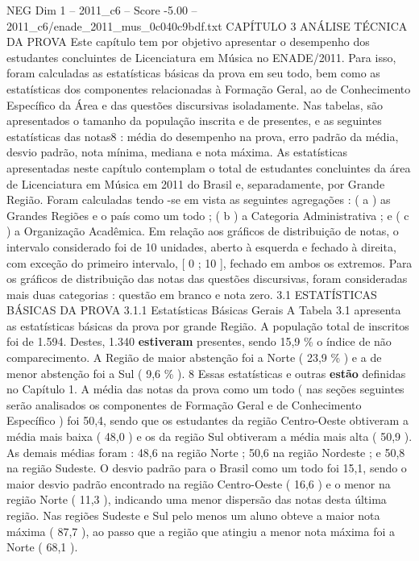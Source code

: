 \begin{textsample}{NEG Dim 1 – 2011\_c6 – Score -5.00 – 2011\_c6/enade\_2011\_mus\_0c040c9bdf.txt}  \label{ex:f1_neg_223}
CAPÍTULO 3 ANÁLISE TÉCNICA DA PROVA Este capítulo tem por objetivo apresentar o desempenho dos estudantes concluintes de Licenciatura em Música no ENADE/2011.
Para isso, foram calculadas as estatísticas básicas da prova em seu todo, bem como as estatísticas dos componentes relacionadas à Formação Geral, ao de Conhecimento Específico da Área e das questões discursivas isoladamente.
Nas tabelas, são apresentados o tamanho da população inscrita e de presentes, e as seguintes estatísticas das notas8 : média do desempenho na prova, erro padrão da média, desvio padrão, nota mínima, mediana e nota máxima.
As estatísticas apresentadas neste capítulo contemplam o total de estudantes concluintes da área de Licenciatura em Música em 2011 do Brasil e, separadamente, por Grande Região.
Foram calculadas tendo -se em vista as seguintes agregações : ( a ) as Grandes Regiões e o país como um todo ; ( b ) a Categoria Administrativa ; e ( c ) a Organização Acadêmica.
Em relação aos gráficos de distribuição de notas, o intervalo considerado foi de 10 unidades, aberto à esquerda e fechado à direita, com exceção do primeiro intervalo, [ 0 ; 10 ], fechado em ambos os extremos.
Para os gráficos de distribuição das notas das questões discursivas, foram consideradas mais duas categorias : questão em branco e nota zero. 3.1 ESTATÍSTICAS BÁSICAS DA PROVA 3.1.1 Estatísticas Básicas Gerais A Tabela 3.1 apresenta as estatísticas básicas da prova por grande Região.
A população total de inscritos foi de 1.594.
Destes, 1.340 \textbf{estiveram} presentes, sendo 15,9 \% o índice de não comparecimento.
A Região de maior abstenção foi a Norte ( 23,9 \% ) e a de menor abstenção foi a Sul ( 9,6 \% ). 8 Essas estatísticas e outras \textbf{estão} definidas no Capítulo 1.
A média das notas da prova como um todo ( nas seções seguintes serão analisados os componentes de Formação Geral e de Conhecimento Específico ) foi 50,4, sendo que os estudantes da região Centro-Oeste obtiveram a média mais baixa ( 48,0 ) e os da região Sul obtiveram a média mais alta ( 50,9 ).
As demais médias foram : 48,6 na região Norte ; 50,6 na região Nordeste ; e 50,8 na região Sudeste.
O desvio padrão para o Brasil como um todo foi 15,1, sendo o maior desvio padrão encontrado na região Centro-Oeste ( 16,6 ) e o menor na região Norte ( 11,3 ), indicando uma menor dispersão das notas desta última região.
Nas regiões Sudeste e Sul pelo menos um aluno obteve a maior nota máxima ( 87,7 ), ao passo que a região que atingiu a menor nota máxima foi a Norte ( 68,1 ).

\end{textsample}
